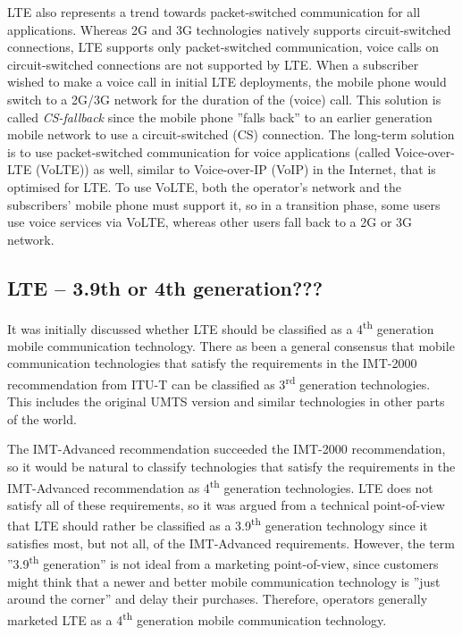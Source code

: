 LTE also represents a trend towards packet-switched communication for all applications. Whereas 2G and 3G technologies natively supports circuit-switched connections, LTE supports only packet-switched communication, \ie voice calls on circuit-switched connections are not supported by LTE. When a subscriber wished to make a voice call in initial LTE deployments, the mobile phone would switch to a 2G/3G network for the duration of the (voice) call. This solution is called \emph{CS-fallback} since the mobile phone ''falls back'' to an earlier generation mobile network to use a circuit-switched (CS) connection. The long-term solution is to use packet-switched communication for voice applications (called Voice-over-LTE (VoLTE)) as well, similar to Voice-over-IP (VoIP) in the Internet, that is optimised for LTE. To use VoLTE, both the operator's network and the subscribers' mobile phone must support it, so in a transition phase, some users use voice services via VoLTE, whereas other users fall back to a 2G or 3G network.

\subsection{LTE -- 3.9th or 4th generation???}
It was initially discussed whether LTE should be classified as a 4\textsuperscript{th} generation mobile communication technology. There as been a general consensus that mobile communication technologies that satisfy the requirements in the IMT-2000 recommendation from ITU-T can be classified as 3\textsuperscript{rd} generation technologies. This includes the original UMTS version and similar technologies in other parts of the world.

The IMT-Advanced recommendation succeeded the IMT-2000 recommendation, so it would be natural to classify technologies that satisfy the requirements in the IMT-Advanced recommendation as 4\textsuperscript{th} generation technologies. LTE does not satisfy all of these requirements, so it was argued from a technical point-of-view that LTE should rather be classified as a 3.9\textsuperscript{th} generation technology since it satisfies most, but not all, of the IMT-Advanced requirements. However, the term ''3.9\textsuperscript{th} generation'' is not ideal from a marketing point-of-view, since customers might think that a newer and better mobile communication technology is ''just around the corner'' and delay their purchases. Therefore, operators generally marketed LTE as a 4\textsuperscript{th} generation mobile communication technology.

